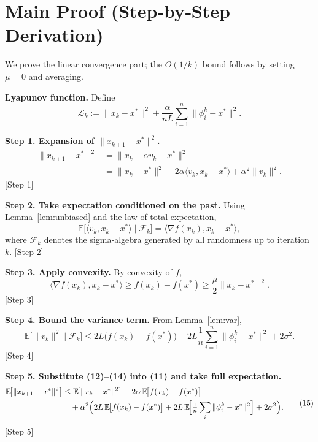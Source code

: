 \documentclass[11pt]{article}
\newcommand{\E}{\mathbb{E}}
\begin{document}
\section*{Main Proof (Step‑by‑Step Derivation)}
We prove the linear convergence part; the $O(1/k)$ bound follows by setting $\mu=0$ and averaging.

\noindent\textbf{Lyapunov function.}
Define
\[
\mathcal{L}_{k}:=\|x_{k}-x^{*}\|^{2}
+\frac{\alpha}{nL}\sum_{i=1}^{n}\|\phi^{k}_{i}-x^{*}\|^{2}.
\tag{10}
\]

\noindent\textbf{Step 1. Expansion of $\|x_{k+1}-x^{*}\|^{2}$.}
\[
\begin{aligned}
\|x_{k+1}-x^{*}\|^{2}
&=\|x_{k}-\alpha v_{k}-x^{*}\|^{2}\\
&=\|x_{k}-x^{*}\|^{2}
-2\alpha\langle v_{k},x_{k}-x^{*}\rangle
+\alpha^{2}\|v_{k}\|^{2}.
\end{aligned}
\tag{11}
\]
[Step 1]

\noindent\textbf{Step 2. Take expectation conditioned on the past.}
Using Lemma~\ref{lem:unbiased} and the law of total expectation,
\[
\E\!\bigl[\langle v_{k},x_{k}-x^{*}\rangle\mid\mathcal{F}_{k}\bigr]
= \langle \nabla f(x_{k}),x_{k}-x^{*}\rangle,
\tag{12}
\]
where $\mathcal{F}_{k}$ denotes the sigma‑algebra generated by all randomness up to iteration $k$.
[Step 2]

\noindent\textbf{Step 3. Apply convexity.}
By convexity of $f$,
\[
\langle \nabla f(x_{k}),x_{k}-x^{*}\rangle
\ge f(x_{k})-f(x^{*}) \ge \frac{\mu}{2}\|x_{k}-x^{*}\|^{2}.
\tag{13}
\]
[Step 3]

\noindent\textbf{Step 4. Bound the variance term.}
From Lemma~\ref{lem:var},
\[
\E\!\bigl[\|v_{k}\|^{2}\mid\mathcal{F}_{k}\bigr]
\le 2L\bigl(f(x_{k})-f(x^{*})\bigr)
+2L\frac{1}{n}\sum_{i=1}^{n}\|\phi^{k}_{i}-x^{*}\|^{2}
+2\sigma^{2}.
\tag{14}
\]
[Step 4]

\noindent\textbf{Step 5. Substitute (12)–(14) into (11) and take full expectation.}
\[
\begin{aligned}
\E\!\bigl[\|x_{k+1}-x^{*}\|^{2}\bigr]
&\le \E\!\bigl[\|x_{k}-x^{*}\|^{2}\bigr]
-2\alpha\,\E\!\bigl[f(x_{k})-f(x^{*})\bigr] \\
&\quad +\alpha^{2}\Bigl(
2L\,\E\!\bigl[f(x_{k})-f(x^{*})\bigr]
+2L\,\E\!\Bigl[\tfrac1n\sum_{i}\|\phi^{k}_{i}-x^{*}\|^{2}\Bigr]
+2\sigma^{2}\Bigr).
\end{aligned}
\tag{15}
\]
[Step 5]
\end{document}
